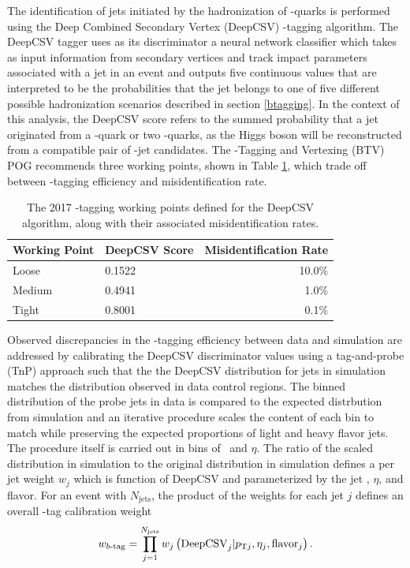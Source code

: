 The identification of jets initiated by the hadronization of \qrkb-quarks is performed using the Deep Combined Secondary Vertex (DeepCSV)\cite{CMSBTAG} \qrkb-tagging algorithm. The DeepCSV tagger uses as its discriminator a neural network classifier which takes as input information from secondary vertices and track impact parameters associated with a jet in an event and outputs five continuous values that are interpreted to be the probabilities that the jet belongs to one of five different possible hadronization scenarios described in section \ref{btagging}. In the context of this analysis, the DeepCSV score refers to the summed probability that a jet originated from a \qrkb-quark or two \qrkb-quarks, as the Higgs boson will be reconstructed from a compatible pair of \qrkb-jet candidates. The \qrkb-Tagging and Vertexing (BTV) POG recommends three working points, shown in Table \ref{tbl:deepcsvwp}, which trade off between \qrkb-tagging efficiency and misidentification rate.

\begin{table}[htbp]
  \caption[2017 DeepCSV Working Points]{The 2017 \qrkb-tagging working points defined for the DeepCSV algorithm, along with their associated misidentification rates.\cite{CMSBTAG}}
  \label{tbl:deepcsvwp}
  \begin{tabularx}{6.5in}{XXr}
    \hline
    Working Point & DeepCSV Score & Misidentification Rate \\
    \hline
    Loose         & 0.1522        & 10.0\%                 \\
    Medium        & 0.4941        & 1.0\%                  \\
    Tight         & 0.8001        & 0.1\%                  \\
    \hline
  \end{tabularx}
\end{table}

Observed discrepancies in the \qrkb-tagging efficiency between data and simulation are addressed by calibrating the DeepCSV discriminator values using a tag-and-probe (TnP) approach such that the the DeepCSV distribution for jets in simulation matches the distribution observed in data control regions. The binned distribution of the probe jets in data is compared to the expected distrbution from simulation and an iterative procedure scales the content of each bin to match while preserving the expected proportions of light and heavy flavor jets. The procedure itself is carried out in bins of \pT\ and $\eta$. The ratio of the scaled distribution in simulation to the original distribution in simulation defines a per jet weight $w_{j}$ which is function of DeepCSV and parameterized by the jet \pT, $\eta$, and flavor. For an event with $N_{\mathrm{jets}}$, the product of the weights for each jet $j$ defines an overall \qrkb-tag calibration weight
\begin{equation}
  w_{\qrkb\text{-}\mathrm{tag}} = \prod_{j=1}^{N_{\mathrm{jets}}} w_{j} \left( \mathrm{DeepCSV}_{j} | p_{\mathrm{T}j}, \eta_{j}, \mathrm{flavor}_{j} \right).
  \label{eq:btagweight}
\end{equation}

